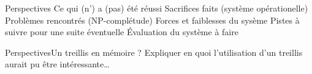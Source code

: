 \begin{frame}{Perspectives}
Ce qui (n') a (pas) été réussi
Sacrifices faits (système opérationelle)
Problèmes rencontrés (NP-complétude)
Forces et faiblesses du sysème
Pistes à suivre pour une suite éventuelle
Évaluation du système à faire
\end{frame}

\begin{frame}{Perspectives}{Un treillis en mémoire ?}
Expliquer en quoi l'utilisation d'un treillis aurait pu être intéressante\ldots
\end{frame}